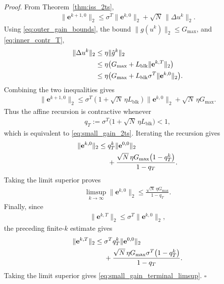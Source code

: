 \documentclass[letterpaper, 10 pt, conference]{ieeeconf} %
\newenvironment{proof}[1][Proof]{\par\noindent\textit{#1. }\ignorespaces}
  {\hfill$\square$\par}
\begin{document}
\begin{proof}
From Theorem~\ref{thm:iss_2ts},
\begin{align}
\|\mathbf e^{k+1,0}\|_2
\le
\sigma^T\|\mathbf e^{k,0}\|_2+\sqrt N\,\|\Delta u^k\|_2.
\end{align}
Using \eqref{eq:outer_gain_bounds}, the bound \(\|g(u^k)\|_2\le G_{\max}\), and \eqref{eq:inner_contr_T},
\begin{align}
\|\Delta u^k\|_2
&\le
\eta\|\hat g^k\|_2 \notag\\
&\le
\eta\big(G_{\max}+L_{\mathrm{blk}}\|\mathbf e^{k,T}\|_2\big) \notag\\
&\le
\eta\big(G_{\max}+L_{\mathrm{blk}}\sigma^T\|\mathbf e^{k,0}\|_2\big).
\end{align}
Combining the two inequalities gives
\begin{align}
\|\mathbf e^{k+1,0}\|_2
\le
\sigma^T(1+\sqrt N\,\eta L_{\mathrm{blk}})\|\mathbf e^{k,0}\|_2
+\sqrt N\,\eta G_{\max}.
\end{align}
Thus the affine recursion is contractive whenever
\begin{align}
q_T
:=
\sigma^T
\bigl(1+\sqrt N\,\eta L_{\mathrm{blk}}\bigr)
<1,
\end{align}
which is equivalent to \eqref{eq:small_gain_2ts}. Iterating the recursion gives
\begin{align}
\|\mathbf e^{k,0}\|_2
\le{}&
q_T^k\|\mathbf e^{0,0}\|_2
\notag\\
&+
\frac{
\sqrt N\,\eta G_{\max}
\bigl(1-q_T^k\bigr)
}{
1-q_T
}.
\end{align}
Taking the limit superior proves
\begin{align}
\limsup_{k\to\infty}\|\mathbf e^{k,0}\|_2
\le
\frac{\sqrt N\,\eta G_{\max}}{1-q_T}.
\end{align}
Finally, since
\begin{align}
\|\mathbf e^{k,T}\|_2
\le
\sigma^T\|\mathbf e^{k,0}\|_2,
\end{align}
the preceding finite-\(k\) estimate gives
\begin{align}
\|\mathbf e^{k,T}\|_2
\le{}&
\sigma^T q_T^k
\|\mathbf e^{0,0}\|_2
\notag\\
&+
\frac{
\sqrt N\,\eta G_{\max}\sigma^T
\bigl(1-q_T^k\bigr)
}{
1-q_T
}.
\label{eq:small_gain_terminal}
\end{align}
Taking the limit superior gives \eqref{eq:small_gain_terminal_limsup}.
\end{proof}
\end{document}
